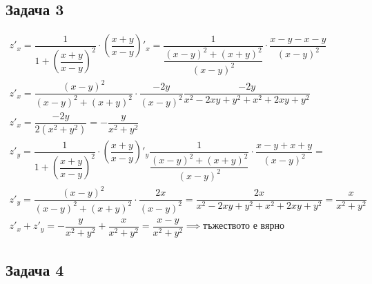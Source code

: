\documentclass[a4paper,fleqn,12pt]{article}
\theoremstyle{definition}
\begin{document}
\subsection*{Задача 3}
\begin{gather*}
z'_x = \dfrac{1}{1 + \left( \dfrac{x+y}{x-y} \right)^2} \cdot \left( \dfrac{x+y}{x-y} \right)'_x =  \dfrac{1}{\dfrac{(x-y)^2 + (x+y)^2}{(x-y)^2}} \cdot \dfrac{x-y-x-y}{(x-y)^2} \\
z'_x = \dfrac{(x-y)^2}{(x-y)^2 + (x+y)^2} \cdot \dfrac{-2y}{(x-y)^2}\dfrac{-2y}{x^2 -2xy+y^2 + x^2+2xy+y^2} \\
z'_x = \dfrac{-2y}{2(x^2+y^2)} =  -\dfrac{y}{x^2+y^2} \\
z'_y = \dfrac{1}{1 + \left( \dfrac{x+y}{x-y} \right)^2} \cdot \left( \dfrac{x+y}{x-y} \right)'_y  \dfrac{1}{\dfrac{(x-y)^2 + (x+y)^2}{(x-y)^2}} \cdot \dfrac{x-y+x+y}{(x-y)^2} = \\
z'_y = \dfrac{(x-y)^2}{(x-y)^2 + (x+y)^2} \cdot \dfrac{2x}{(x-y)^2} = \dfrac{2x}{x^2 -2xy+y^2 + x^2+2xy+y^2} = \dfrac{x}{x^2+y^2}\\
z'_x + z'_y = -\dfrac{y}{x^2+y^2} + \dfrac{x}{x^2+y^2} = \dfrac{x-y}{x^2+y^2} \implies \text{тъжеството е вярно}
\end{gather*}

\subsection*{Задача 4}
\end{document}

